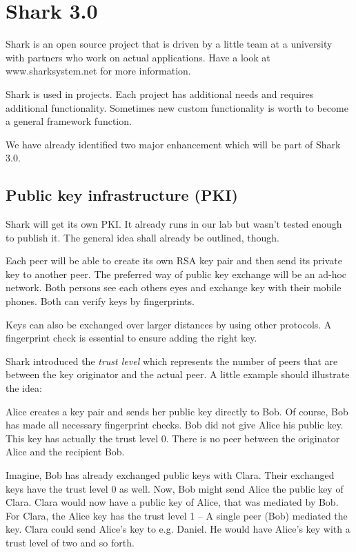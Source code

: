 \chapter{Shark 3.0}
Shark is an open source project that is driven by a little team at a university with partners who work on actual applications. Have a look at www.sharksystem.net for more information.

Shark is used in projects. Each project has additional needs and requires additional functionality. Sometimes new custom functionality is worth to become a general framework function.

We have already identified two major enhancement which will be part of Shark 3.0.


\section{Public key infrastructure (PKI)}
Shark will get its own PKI. It already runs in our lab but wasn't tested enough to publish it. The general idea shall already be outlined, though.

Each peer will be able to create its own RSA key pair and then send its private key to another peer. The preferred way of public key exchange will be an ad-hoc network. Both persons see each others eyes and exchange key with their mobile phones.
Both can verify keys by fingerprints.

Keys can also be exchanged over larger distances by using other protocols. A fingerprint check is essential to ensure adding the right key.

Shark introduced the {\it trust level} which represents the number of peers that are between the key originator and the actual peer. A little example should illustrate the idea:

Alice creates a key pair and sends her public key directly to Bob. Of course, Bob has made all necessary fingerprint checks. Bob did not give Alice his public key. This key has actually the trust level 0. There is no peer between the originator Alice and the recipient Bob.

Imagine, Bob has already exchanged public keys with Clara. Their exchanged keys have the trust level 0 as well. Now, Bob might send Alice the public key of Clara. Clara would now have a public key of Alice, that was mediated by Bob. For Clara, the Alice key has the trust level 1 -- A single peer (Bob) mediated the key. Clara could send Alice's key to e.g. Daniel. He would have Alice's key with a trust level of two and so forth.


